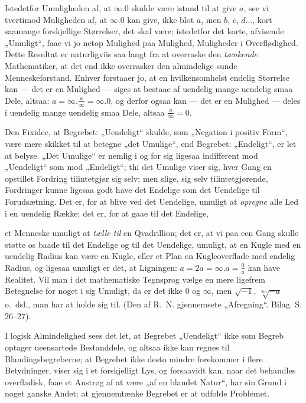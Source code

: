 \documentclass[12pt,a4paper]{book}
\begin{document}
Istedetfor Umuligheden af, at $\infty.0$ skulde være istand til at
give $a$, see vi tvertimod Muligheden af, at $\infty.0$ kan give, ikke
blot $a$, men $b$, $c$, $d\ldots$, kort saamange forskjellige
Størrelser, det skal være; istedetfor det korte, afvisende „Umuligt“,
faae vi jo netop Mulighed paa Mulighed, Muligheder i Overflødighed.
Dette Resultat er naturligviis saa langt fra at overraske den
\emph{tænkende} Mathematiker, at det end ikke overrasker den
almindelige sunde Menneskeforstand. Enhver forstaaer jo, at en
hvilkensomhelst endelig Størrelse kan --- det er en Mulighed --- siges
at bestaae af uendelig mange uendelig smaa Dele, altsaa:
$a = \infty.\frac{a}{\infty} = \infty.0$, og derfor ogsaa kan --- det
er en Mulighed --- deles i uendelig mange uendelig smaa Dele, altsaa
$\frac{a}{\infty} = 0$.

Den Fixidee, at Begrebet: „Uendeligt“ skulde, som „Negation i positiv
Form“, være mere skikket til at betegne „det Umulige“, end Begrebet:
„Endeligt“, er let at belyse. „Det Umulige“ er nemlig i og for sig
ligesaa indifferent mod „Uendeligt“ som mod „Endeligt“; thi det
Umulige viser sig, hver Gang en opstillet Fordring tilintetgjør sig
selv; men slige, sig selv tilintetgjørende, Fordringer kunne ligesaa
godt have det Endelige som det Uendelige til Forudsætning. Det er,
for at blive ved det Uendelige, umuligt at \emph{opregne} alle Led i
en uendelig Række; det er, for at gaae til det Endelige,

et Menneske umuligt at \emph{tælle til} en Qvadrillion; det er, at
vi paa een Gang skulle støtte os baade til det Endelige og
til det Uendelige, umuligt, at en Kugle med en uendelig
Radius kan være en Kugle, eller et Plan en Kugleoverflade
med endelig Radius, og ligesaa umuligt er det, at Ligningen:
$a = 2a = \infty.a = \frac{0}{a}$ kan have Realitet. Vil man i det
mathematiske Tegnsprog vælge en mere ligefrem Betegnelse for
noget i sig Umuligt, da er det ikke $0$ og $\infty$, men $\sqrt{-1}$,
$\sqrt[2m]{-a}$ o.~dsl., man har at holde sig til. (Den af R.~N. gjennemsete
„Afregning“. Bilag. S. 26--27).

I logisk Almindelighed sees det let, at Begrebet „Uendeligt“
ikke som Begreb optager ueensartede Bestanddele, og
altsaa ikke kan regnes til Blandingsbegreberne; at Begrebet
ikke desto mindre forekommer i flere Betydninger, viser sig i
et forskjelligt Lys, og forsaavidt kan, naar det behandles
overfladisk, faae et Anstrøg af at være „af en blandet Natur“,
har sin Grund i noget ganske Andet: at gjennemtænke Begrebet
er at udfolde Problemet.
\end{document}
